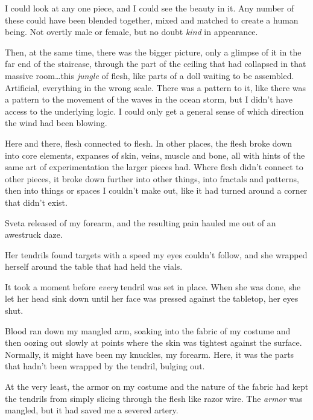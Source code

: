 I could look at any one piece, and I could see the beauty in it.  Any number of these could have been blended together, mixed and matched to create a human being.  Not overtly male or female, but no doubt \emph{kind} in appearance.



Then, at the same time, there was the bigger picture, only a glimpse of it in the far end of the staircase, through the part of the ceiling that had collapsed in that massive room\ldots this \emph{jungle }of flesh, like parts of a doll waiting to be assembled.  Artificial, everything in the wrong scale.  There was a pattern to it, like there was a pattern to the movement of the waves in the ocean storm, but I didn't have access to the underlying logic.  I could only get a general sense of which direction the wind had been blowing.



Here and there, flesh connected to flesh.  In other places, the flesh broke down into core elements, expanses of skin, veins, muscle and bone, all with hints of the same art of experimentation the larger pieces had.  Where flesh didn't connect to other pieces, it broke down further into other things, into fractals and patterns, then into things or spaces I couldn't make out, like it had turned around a corner that didn't exist.



Sveta released of my forearm, and the resulting pain hauled me out of an awestruck daze.



Her tendrils found targets with a speed my eyes couldn't follow, and she wrapped herself around the table that had held the vials.



It took a moment before \emph{every} tendril was set in place.  When she was done, she let her head sink down until her face was pressed against the tabletop, her eyes shut.



Blood ran down my mangled arm, soaking into the fabric of my costume and then oozing out slowly at points where the skin was tightest against the surface.  Normally, it might have been my knuckles, my forearm.  Here, it was the parts that hadn't been wrapped by the tendril, bulging out.



At the very least, the armor on my costume and the nature of the fabric had kept the tendrils from simply slicing through the flesh like razor wire.  The \emph{armor }was mangled, but it had saved me a severed artery.



